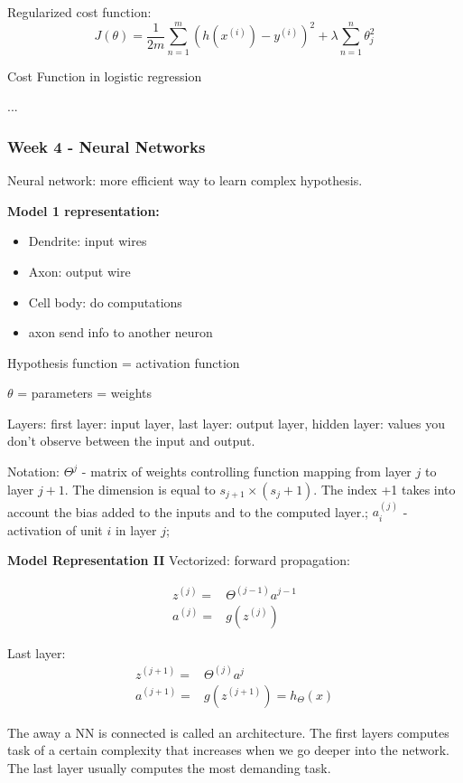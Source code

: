 \documentclass[12pt,a4paper]{report}
\begin{document}
Regularized cost function:
\begin{equation}
J(\theta) = \frac{1}{2m} \sum_{n=1}^{m} (h(x^{(i)})-y^{(i)})^{2} + \lambda\sum_{n=1}^{n} \theta_{j}^{2}
\end{equation}

Cost Function in logistic regression

...	
	
\subsubsection{Week 4 - Neural Networks}
	
	Neural network: more efficient way to learn complex hypothesis.
	
	\textbf{Model 1 representation: }
	\begin{itemize}
	\item Dendrite: input wires
	\item Axon: output wire
	\item Cell body: do computations
	\item axon send info to another neuron
	\end{itemize}
	
	Hypothesis function = activation function
	
	$\theta$ = parameters = weights
	
	Layers: first layer: input layer, last layer: output layer, hidden layer: values you don't observe between the input and output.
	
	Notation: $\Theta^{j}$ - matrix of weights controlling function mapping from layer $j$ to layer $j+1$. The dimension is equal to $s_{j+1} \times (s_{j}+1)$. The index +1 takes into account the bias added to the inputs and to the computed layer.; $a_{i}^{(j)}$ - activation of unit $i$ in layer $j$; 
	
	\textbf{Model Representation II}
	Vectorized: forward propagation:
	
	\begin{align}\label{eq:my_eq}
	z^{(j)} = & \Theta^{(j-1)}a^{j-1} \\
	a^{(j)} = & g(z^{(j)})
	\end{align}
	
Last layer: 	
\begin{align}\label{eq:my_eq}
	z^{(j+1)} = & \Theta^{(j)}a^{j} \\
	a^{(j+1)} = & g(z^{(j+1)}) = h_{\Theta}(x)
	\end{align}
	
	The away a NN is connected is called an architecture.	
	The first layers computes task of a certain complexity that increases when we go deeper into the network. The last layer usually computes the most demanding task.
	
\end{document}
